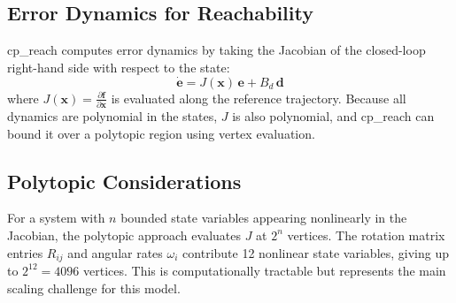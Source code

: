 \documentclass[11pt]{article}
\newcommand{\der}[1]{\dot{#1}}
\begin{document}
\subsection{Error Dynamics for Reachability}

cp\_reach computes error dynamics by taking the Jacobian of the
closed-loop right-hand side with respect to the state:
\begin{equation}
  \der{\bm{e}} = J(\bm{x})\,\bm{e} + B_d\,\bm{d}
\end{equation}
where $J(\bm{x}) = \frac{\partial \bm{f}}{\partial \bm{x}}$ is
evaluated along the reference trajectory. Because all dynamics are
polynomial in the states, $J$ is also polynomial, and cp\_reach can
bound it over a polytopic region using vertex evaluation.

\subsection{Polytopic Considerations}

For a system with $n$ bounded state variables appearing nonlinearly in
the Jacobian, the polytopic approach evaluates $J$ at $2^n$ vertices.
The rotation matrix entries $R_{ij}$ and angular rates $\omega_i$
contribute 12 nonlinear state variables, giving up to $2^{12} = 4096$
vertices. This is computationally tractable but represents the main
scaling challenge for this model.
\end{document}

